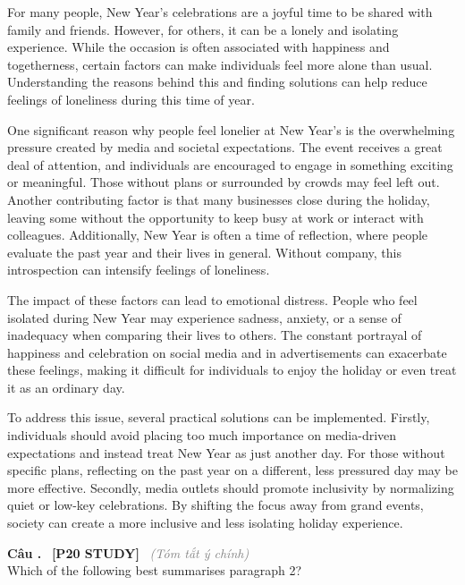 \documentclass[12pt,a4paper,twoside]{article}
\newcounter{qcounter}
\newcommand{\question}[2][]{%
    \stepcounter{qcounter}%
    \par\vspace{6pt}%
    \noindent\textcolor{primaryBlue}{\textbf{Câu \theqcounter.}}~%
    \textcolor{secondaryBlue}{\small\textbf{[P20 STUDY]}}~%
    \if\relax\detokenize{#1}\relax\else\textcolor{gray}{\small\textit{(#1)}}~\fi\\[1pt]
    \noindent #2%
}
\newenvironment{readingpassage}[1][]{%
    \begin{tcolorbox}[enhanced, colback=grayLight, colframe=secondaryBlue,
        coltitle=textDark, fonttitle=\bfseries, title={#1},
        rounded corners, arc=3mm, boxrule=1pt,
        left=15pt, right=15pt, top=10pt, bottom=10pt,
        breakable, before skip=10pt, after skip=10pt, drop fuzzy shadow]
    \setstretch{1.3}
}{\end{tcolorbox}}
\begin{document}
\begin{readingpassage}[]
For many people, New Year’s celebrations are a joyful time to be shared with family and friends. However, for others, it can be a lonely and isolating experience. While the occasion is often associated with happiness and togetherness, certain factors can make individuals feel more alone than usual. Understanding the reasons behind this and finding solutions can help reduce feelings of loneliness during this time of year.

One significant reason why people feel lonelier at New Year’s is the overwhelming pressure created by media and societal expectations. The event receives a great deal of attention, and individuals are encouraged to engage in something exciting or meaningful. Those without plans or surrounded by crowds may feel left out. Another contributing factor is that many businesses close during the holiday, leaving some without the opportunity to keep busy at work or interact with colleagues. Additionally, New Year is often a time of reflection, where people evaluate the past year and their lives in general. Without company, this introspection can intensify feelings of loneliness.

The impact of these factors can lead to emotional distress. People who feel isolated during New Year may experience sadness, anxiety, or a sense of inadequacy when comparing their lives to others. The constant portrayal of happiness and celebration on social media and in advertisements can exacerbate these feelings, making it difficult for individuals to enjoy the holiday or even treat it as an ordinary day.

To address this issue, several practical solutions can be implemented. Firstly, individuals should avoid placing too much importance on media-driven expectations and instead treat New Year as just another day. For those without specific plans, reflecting on the past year on a different, less pressured day may be more effective. Secondly, media outlets should promote inclusivity by normalizing quiet or low-key celebrations. By shifting the focus away from grand events, society can create a more inclusive and less isolating holiday experience.
\end{readingpassage}

\question[Tóm tắt ý chính]{Which of the following best summarises paragraph 2?}
\end{document}
